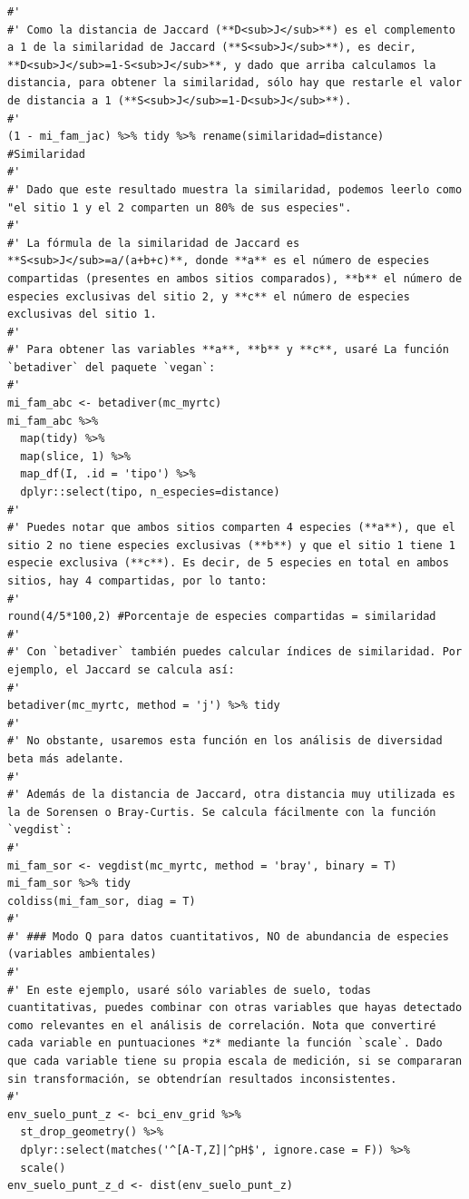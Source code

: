 \documentclass[11pt,]{article}
\begin{document}
\begin{verbatim}
#' 
#' Como la distancia de Jaccard (**D<sub>J</sub>**) es el complemento a 1 de la similaridad de Jaccard (**S<sub>J</sub>**), es decir, **D<sub>J</sub>=1-S<sub>J</sub>**, y dado que arriba calculamos la distancia, para obtener la similaridad, sólo hay que restarle el valor de distancia a 1 (**S<sub>J</sub>=1-D<sub>J</sub>**).
#' 
(1 - mi_fam_jac) %>% tidy %>% rename(similaridad=distance) #Similaridad
#'
#' Dado que este resultado muestra la similaridad, podemos leerlo como "el sitio 1 y el 2 comparten un 80% de sus especies".
#' 
#' La fórmula de la similaridad de Jaccard es **S<sub>J</sub>=a/(a+b+c)**, donde **a** es el número de especies compartidas (presentes en ambos sitios comparados), **b** el número de especies exclusivas del sitio 2, y **c** el número de especies exclusivas del sitio 1.
#' 
#' Para obtener las variables **a**, **b** y **c**, usaré La función `betadiver` del paquete `vegan`:
#' 
mi_fam_abc <- betadiver(mc_myrtc) 
mi_fam_abc %>%
  map(tidy) %>%
  map(slice, 1) %>%
  map_df(I, .id = 'tipo') %>% 
  dplyr::select(tipo, n_especies=distance)
#' 
#' Puedes notar que ambos sitios comparten 4 especies (**a**), que el sitio 2 no tiene especies exclusivas (**b**) y que el sitio 1 tiene 1 especie exclusiva (**c**). Es decir, de 5 especies en total en ambos sitios, hay 4 compartidas, por lo tanto:
#' 
round(4/5*100,2) #Porcentaje de especies compartidas = similaridad
#' 
#' Con `betadiver` también puedes calcular índices de similaridad. Por ejemplo, el Jaccard se calcula así:
#' 
betadiver(mc_myrtc, method = 'j') %>% tidy
#' 
#' No obstante, usaremos esta función en los análisis de diversidad beta más adelante.
#' 
#' Además de la distancia de Jaccard, otra distancia muy utilizada es la de Sorensen o Bray-Curtis. Se calcula fácilmente con la función `vegdist`:
#' 
mi_fam_sor <- vegdist(mc_myrtc, method = 'bray', binary = T)
mi_fam_sor %>% tidy
coldiss(mi_fam_sor, diag = T)
#' 
#' ### Modo Q para datos cuantitativos, NO de abundancia de especies (variables ambientales)
#' 
#' En este ejemplo, usaré sólo variables de suelo, todas cuantitativas, puedes combinar con otras variables que hayas detectado como relevantes en el análisis de correlación. Nota que convertiré cada variable en puntuaciones *z* mediante la función `scale`. Dado que cada variable tiene su propia escala de medición, si se compararan sin transformación, se obtendrían resultados inconsistentes.
#' 
env_suelo_punt_z <- bci_env_grid %>%
  st_drop_geometry() %>% 
  dplyr::select(matches('^[A-T,Z]|^pH$', ignore.case = F)) %>% 
  scale()
env_suelo_punt_z_d <- dist(env_suelo_punt_z)

\end{verbatim}
\end{document}
